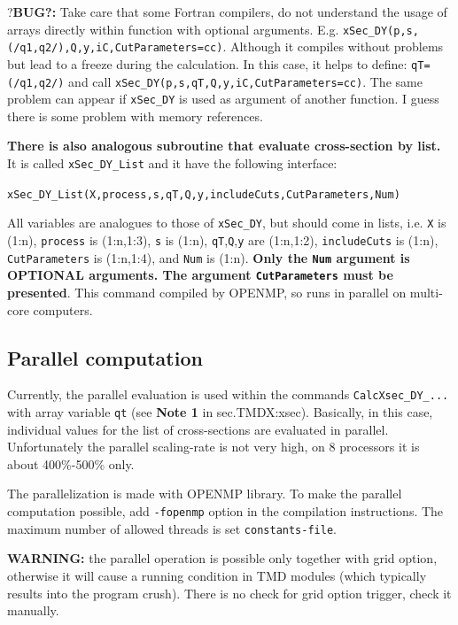 \documentclass[prd,nofootinbib,eqsecnum,final]{revtex4}
\renewcommand{\(}{\left(}
\renewcommand{\)}{\right)}
\renewcommand{\[}{\left[}
\renewcommand{\]}{\right]}
\newcommand{\red}[1]{{\color[rgb]{1,0,0} #1}}
\newcommand{\blue}[1]{{\color{blue} #1}}
\begin{document}
\red{?\textbf{BUG?:}} Take care that some Fortran compilers, do not understand the usage of arrays directly within function with optional arguments. E.g. \texttt{xSec\_DY(p,s,(/q1,q2/),Q,y,iC,CutParameters=cc)}. Although it compiles without problems but lead to a freeze during the calculation. In this case, it helps to define: \texttt{qT=(/q1,q2/)} and call \texttt{xSec\_DY(p,s,qT,Q,y,iC,CutParameters=cc)}. The same problem can appear if \texttt{xSec\_DY} is used as argument of another function. I guess there is some problem with memory references.

\begin{tcolorbox}
\textbf{\blue{There is also analogous subroutine that evaluate cross-section by list.}} It is called \texttt{xSec\_DY\_List} and it have the following interface:

\begin{center}
\texttt{xSec\_DY\_List(X,process,s,qT,Q,y,includeCuts,CutParameters,Num)}
\end{center}
All variables are analogues to those of \texttt{xSec\_DY}, but should come in lists, i.e. \texttt{X} is (1:n), \texttt{process} is (1:n,1:3), \texttt{s} is (1:n), \texttt{qT},\texttt{Q},\texttt{y} are (1:n,1:2), \texttt{includeCuts} is (1:n), \texttt{CutParameters} is (1:n,1:4), and \texttt{Num} is (1:n). \textbf{Only the \texttt{Num} argument is OPTIONAL arguments. The argument \texttt{CutParameters} must be presented}. This command compiled by OPENMP, so runs in parallel on multi-core computers.
\end{tcolorbox}

\subsection{Parallel computation}

Currently, the parallel evaluation is used within the commands \texttt{CalcXsec{\_}DY{\_}...} with \blue{array variable \texttt{qt}} (see \textbf{Note 1} in sec.{TMDX:xsec}). Basically, in this case, individual values for the list of cross-sections are evaluated in parallel. Unfortunately the parallel scaling-rate is not very high, on 8 processors it is about 400\%-500\% only.

The parallelization is made with OPENMP library. To make the parallel computation possible, add \texttt{-fopenmp} option in the compilation instructions. The maximum number of allowed threads is set \texttt{constants-file}.

\begin{tcolorbox}
\red{\textbf{WARNING:}} the parallel operation is possible only together with grid option, otherwise it will cause a running condition in TMD modules (which typically results into the program crush). There is no check for grid option trigger, check it manually.
\end{tcolorbox}
\end{document}
